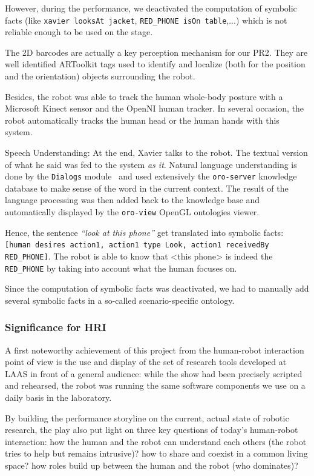However, during the performance, we deactivated the computation of symbolic
facts (like {\tt xavier looksAt jacket}, {\tt RED\_PHONE isOn table},...) which
is not reliable enough to be used on the stage.

The 2D barcodes are actually a key perception mechanism for our PR2. They are
well identified {\sc ARToolkit} tags used to identify and localize (both for the
position and the orientation) objects surrounding the robot.

Besides, the robot was able to track the human whole-body posture with a
Microsoft Kinect sensor and the {\sc OpenNI} human tracker. In several
occasion, the robot automatically tracks the human head or the human hands with
this system.

Speech Understanding: At the end, Xavier talks to the robot. The
textual version of what he said was fed to the system \emph{as it}. Natural
language understanding is done by the {\tt Dialogs}
module~\cite{Lemaignan2011a} and used extensively the {\tt oro-server} knowledge
database to make sense of the word in the current context. The result of the
language processing was then added back to the knowledge base and automatically
displayed by the {\tt oro-view} OpenGL ontologies viewer.

Hence, the sentence \emph{``look at this phone''} get translated into symbolic
facts: {\tt [human desires action1, action1 type Look, action1 receivedBy
RED\_PHONE]}. The robot is able to know that <this phone> is indeed the {\tt
RED\_PHONE} by taking into account what the human focuses on.

Since the computation of symbolic facts was deactivated, we had to manually add
several symbolic facts in a so-called scenario-specific ontology.

\subsubsection{Significance for HRI}

A first noteworthy achievement of this project from the human-robot
interaction point of view is the use and display of the set of research tools
developed at LAAS in front of a general audience: while the show had been
precisely scripted and rehearsed, the robot was running the same software
components we use on a daily basis in the laboratory.

By building the performance storyline on the current, actual state of robotic
research,  the play also put light on three key questions of today's
human-robot interaction: how the human and the robot can understand each others
(the robot tries to help but remains intrusive)? how to share and coexist in a
common living space? how roles build up between the human and the robot (who
dominates)?

